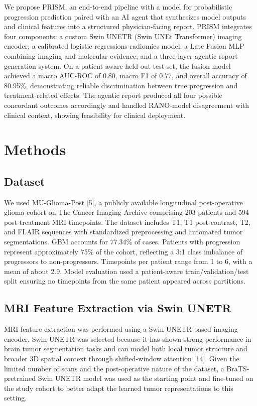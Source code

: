 \documentclass[letterpaper, 10pt, conference]{IEEEtran}
\begin{document}
We propose PRISM, an end-to-end pipeline with a model for probabilistic progression prediction paired with an AI
agent that synthesizes model outputs and clinical features into a structured physician-facing report. PRISM
integrates four components: a custom Swin UNETR (Swin UNEt Transformer) imaging encoder; a calibrated logistic
regressions radiomics model; a Late Fusion MLP combining imaging and molecular evidence; and a three-layer agentic
report generation system. On a patient-aware held-out test set, the fusion model achieved a macro AUC-ROC of 0.80,
macro F1 of 0.77, and overall accuracy of 80.95\%, demonstrating reliable discrimination between true progression
and treatment-related effects. The agentic report produced all four possible concordant outcomes accordingly and
handled RANO-model disagreement with clinical context, showing feasibility for clinical deployment.

\section{Methods}

\subsection{Dataset}
We used MU-Glioma-Post [5], a publicly available longitudinal post-operative glioma cohort on The Cancer Imaging
Archive comprising 203 patients and 594 post-treatment MRI timepoints. The dataset includes T1, T1 post-contrast, T2,
and FLAIR sequences with standardized preprocessing and automated tumor segmentations. GBM accounts for 77.34\% of
cases. Patients with progression represent approximately 75\% of the cohort, reflecting a 3:1 class imbalance of
progressors to non-progressors. Timepoints per patient range from 1 to 6, with a mean of about 2.9. Model evaluation
used a patient-aware train/validation/test split ensuring no timepoints from the same patient appeared across
partitions.

\subsection{MRI Feature Extraction via Swin UNETR}
MRI feature extraction was performed using a Swin UNETR-based imaging encoder. Swin UNETR was selected because it has
shown strong performance in brain tumor segmentation tasks and can model both local tumor structure and broader 3D
spatial context through shifted-window attention [14]. Given the limited number of scans and the post-operative
nature of the dataset, a BraTS-pretrained Swin UNETR model was used as the starting point and fine-tuned on the study
cohort to better adapt the learned tumor representations to this setting.
\end{document}

